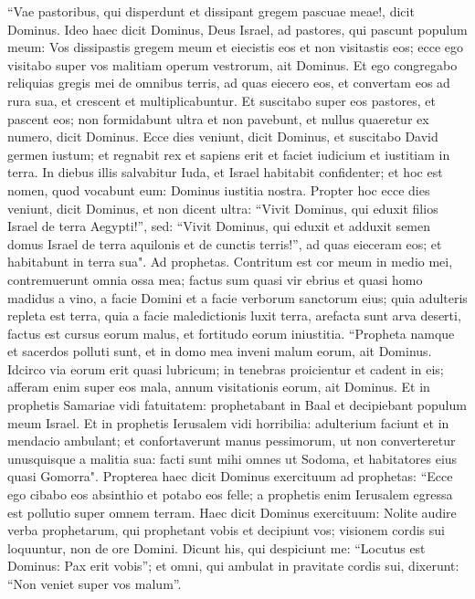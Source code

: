 \begin{biblechapter}  
\verse “Vae pastoribus, qui disperdunt et dissipant gregem pascuae meae!, dicit Dominus. 
\verse Ideo haec dicit Dominus, Deus Israel, ad pastores, qui pascunt populum meum: Vos dissipastis gregem meum et eiecistis eos et non visitastis eos; ecce ego visitabo super vos malitiam operum vestrorum, ait Dominus. 
\verse Et ego congregabo reliquias gregis mei de omnibus terris, ad quas eiecero eos, et convertam eos ad rura sua, et crescent et multiplicabuntur. 
\verse Et suscitabo super eos pastores, et pascent eos; non formidabunt ultra et non pavebunt, et nullus quaeretur ex numero, dicit Dominus. 
\verse Ecce dies veniunt, dicit Dominus, et suscitabo David germen iustum; et regnabit rex et sapiens erit et faciet iudicium et iustitiam in terra. 
\verse In diebus illis salvabitur Iuda, et Israel habitabit confidenter; et hoc est nomen, quod vocabunt eum: Dominus iustitia nostra. 
\verse Propter hoc ecce dies veniunt, dicit Dominus, et non dicent ultra: “Vivit Dominus, qui eduxit filios Israel de terra Aegypti!”, 
\verse sed: “Vivit Dominus, qui eduxit et adduxit semen domus Israel de terra aquilonis et de cunctis terris!”, ad quas eieceram eos; et habitabunt in terra sua". 
\verse Ad prophetas. Contritum est cor meum in medio mei, contremuerunt omnia ossa mea; factus sum quasi vir ebrius et quasi homo madidus a vino, a facie Domini et a facie verborum sanctorum eius; 
\verse quia adulteris repleta est terra, quia a facie maledictionis luxit terra, arefacta sunt arva deserti, factus est cursus eorum malus, et fortitudo eorum iniustitia. 
\verse “Propheta namque et sacerdos polluti sunt, et in domo mea inveni malum eorum, ait Dominus. 
\verse Idcirco via eorum erit quasi lubricum; in tenebras proicientur et cadent in eis; afferam enim super eos mala, annum visitationis eorum, ait Dominus. 
\verse Et in prophetis Samariae vidi fatuitatem: prophetabant in Baal et decipiebant populum meum Israel. 
\verse Et in prophetis Ierusalem vidi horribilia: adulterium faciunt et in mendacio ambulant; et confortaverunt manus pessimorum, ut non converteretur unusquisque a malitia sua: facti sunt mihi omnes ut Sodoma, et habitatores eius quasi Gomorra". 
\verse Propterea haec dicit Dominus exercituum ad prophetas: “Ecce ego cibabo eos absinthio et potabo eos felle; a prophetis enim Ierusalem egressa est pollutio super omnem terram. 
\verse Haec dicit Dominus exercituum: Nolite audire verba prophetarum, qui prophetant vobis et decipiunt vos; visionem cordis sui loquuntur, non de ore Domini. 
\verse Dicunt his, qui despiciunt me: “Locutus est Dominus: Pax erit vobis”; et omni, qui ambulat in pravitate cordis sui, dixerunt: “Non veniet super vos malum”. 

\end{biblechapter}
